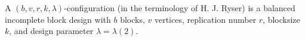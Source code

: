 A $(b, v, r, k, \lambda)$-configuration (in the terminology of H. J. Ryser) is a balanced incomplete block design with $b$ blocks, $v$ vertices, replication number $r$, blocksize $k$, and design parameter $\lambda = \lambda(2)$.
